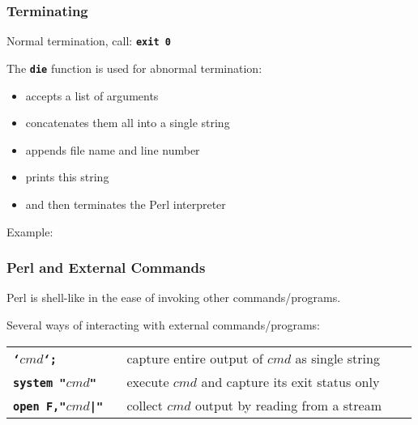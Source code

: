 \begin{frame}
\frametitle{Terminating}
Normal termination, call: \textbf{\tt{exit 0}} 

The \textbf{\tt{die}} function is used for abnormal termination:
\begin{itemize}
\item  accepts a list of arguments
\item  concatenates them all into a single string
\item  appends file name and line number
\item  prints this string
\item  and then terminates the Perl interpreter
\end{itemize}
Example:

\end{frame}

\begin{frame}
\frametitle{Perl and External Commands}
Perl is shell-like in the ease of invoking other commands/programs.

Several ways of interacting with external commands/programs:

\begin{center}
\begin{tabular}{lll}

\begin{minipage}{3cm} \textbf{\tt{{\em{`}}}}$cmd$\textbf{\tt{{\em{`}};}}  ~\end{minipage}
 & \begin{minipage}{18cm} capture entire output of $cmd$ as single string ~\end{minipage}
\\[1ex]

\begin{minipage}{3cm} \textbf{\tt{system "}}$cmd$\textbf{\tt{"}}  ~\end{minipage}
 & \begin{minipage}{18cm} execute $cmd$ and capture its exit status only ~\end{minipage}
\\[1ex]

\begin{minipage}{3cm} \textbf{\tt{open F,"}}$cmd$\textbf{\tt{|"}}  ~\end{minipage}
 & \begin{minipage}{18cm} collect $cmd$ output by reading from a stream ~\end{minipage}
\\[1ex]
\end{tabular}
\end{center}

\end{frame}

